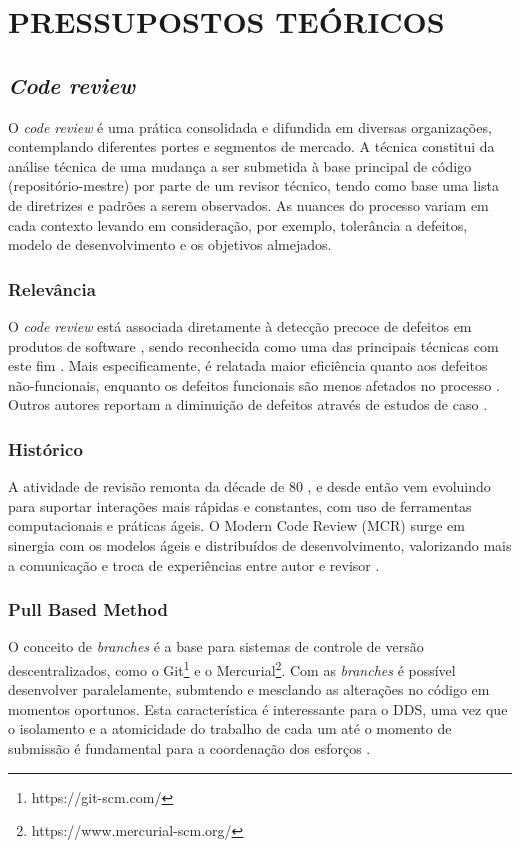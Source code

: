\documentclass[12pt,openany,oneside,a4paper,english,brazil]{abntbibufjf}
\begin{document}
\chapter{PRESSUPOSTOS TEÓRICOS}\label{chap:metodos}

  \section{\textit{Code review}}\label{sec:code_review}
    O \textit{code review} é uma prática consolidada e difundida em diversas organizações, contemplando diferentes portes e segmentos de mercado. A técnica constitui da análise técnica de uma mudança a ser submetida à base principal de código (repositório-mestre) por parte de um revisor técnico, tendo como base uma lista de diretrizes e padrões a serem observados. As nuances do processo variam em cada contexto levando em consideração, por exemplo, tolerância a defeitos, modelo de desenvolvimento e os objetivos almejados.

  \subsection{Relevância}\label{sec:relevancia}
    O \textit{code review} está associada diretamente à detecção precoce de defeitos em produtos de software \cite{schettino2014,Kemerer2009}, sendo reconhecida como uma das principais técnicas com este fim \cite{Boehm2001}. Mais especificamente, é relatada maior eficiência quanto aos defeitos não-funcionais, enquanto os defeitos funcionais são menos afetados no processo \cite{Beller2014202}. Outros autores reportam a diminuição de defeitos através de estudos de caso \cite{McIntosh2014192,Bavota201581,Morales2015171}.

  \subsection{Histórico}\label{sec:historico}
    A atividade de revisão remonta da décade de 80 \cite{Fagan1976}, e desde então vem evoluindo para suportar interações mais rápidas e constantes, com uso de ferramentas computacionais e práticas ágeis. O Modern Code Review (MCR) surge em sinergia com os modelos ágeis e distribuídos de desenvolvimento, valorizando mais a comunicação e troca de experiências entre autor e revisor \cite{Bacchelli2013}.

  \subsection{Pull Based Method}\label{sec:pull_based}
    O conceito de \textit{branches} é a base para sistemas de controle de versão descentralizados, como o  Git\footnote{https://git-scm.com/} e o Mercurial\footnote{https://www.mercurial-scm.org/}. Com as \textit{branches} é possível desenvolver paralelamente, submtendo e mesclando as alterações no código em momentos oportunos. Esta característica é interessante para o DDS, uma vez que o isolamento e a atomicidade do trabalho de cada um até o momento de submissão é fundamental para a coordenação dos esforços \cite{barr2012}.
\end{document}
